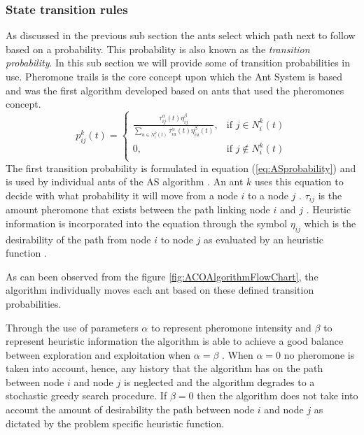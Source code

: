 \subsubsection{State transition rules}
 As discussed in the previous sub section the ants select which path next to follow based on a probability. This probability is also known as the \emph{transition probability}. In this sub section we will provide some of transition probabilities in use. Pheromone trails is the core concept upon which the Ant System is based and was the first algorithm developed based on ants that used the pheromones concept\cite{CompuIntelligenceIntro}. 
\begin{equation}
\label{eq:ASprobability}
p^k_{ij}(t) =
\begin{cases}
	\frac{\tau^{\alpha}_{ij}(t)\eta^{\beta}_{ij}}{\sum_{u \in N^k_i(t)} {\tau^{\alpha}_{iu}(t)\eta^{\beta}_{iu}(t)}}, &\text{if $j \in N^k_i(t)$}\\
	0, &\text{if $j \notin N^k_i(t)$}\\
\end{cases}
\end{equation}
The first transition probability is formulated in equation (\ref{eq:ASprobability}) and is used by individual ants of the AS algorithm \cite{CompuIntelligenceIntro,AntSurvey}. An ant $k$ uses this equation to decide with what probability it will move from a node $i$ to a node $j$ \cite{CompuIntelligenceIntro}. $\tau_{ij}$ is the amount pheromone that exists between the path linking node $i$ and $j$ \cite{CompuIntelligenceIntro,AntsAndStigmergy}. Heuristic information is incorporated into the equation through the symbol $\eta_{ij}$ which is the desirability of the path from node $i$ to node $j$ as evaluated by an heuristic function \cite{CompuIntelligenceIntro,AntsAndStigmergy}. 

As can been observed from the figure \ref{fig:ACOAlgorithmFlowChart}, the algorithm individually moves each ant based on these defined transition probabilities.

Through the use of parameters $\alpha$ to represent pheromone intensity and $\beta$ to represent heuristic information the algorithm is able to achieve a good balance between exploration and exploitation when $\alpha=\beta$ \cite{CompuIntelligenceIntro}. When $\alpha = 0$ no pheromone is taken into account, hence, any history that the algorithm has on the path between node $i$ and node $j$ is neglected and the algorithm degrades to a stochastic greedy search procedure. If $\beta = 0$ then the algorithm does not take into account the amount of desirability the path between node $i$ and node $j$ as dictated by the problem specific heuristic function.

